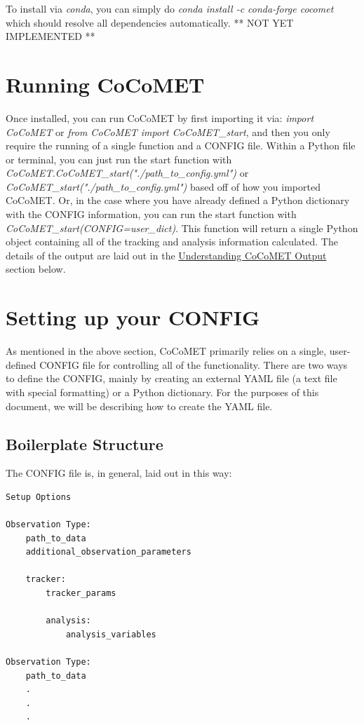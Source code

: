 \documentclass[10pt,a4paper]{article}
\begin{document}
	To install via \emph{conda}, you can simply do \emph{conda install -c conda-forge cocomet} which should resolve all dependencies automatically. ** NOT YET IMPLEMENTED **
	
	\section{Running CoCoMET}
	Once installed, you can run CoCoMET by first importing it via: \emph{import CoCoMET} or \emph{from CoCoMET import CoCoMET\_start}, and then you only require the running of a single function and a CONFIG file. Within a Python file or terminal, you can just run the start function with \emph{CoCoMET.CoCoMET\_start("./path\_to\_config.yml")} or \emph{CoCoMET\_start("./path\_to\_config.yml")} based off of how you imported CoCoMET. Or, in the case where you have already defined a Python dictionary with the CONFIG information, you can run the start function with \emph{CoCoMET\_start(CONFIG=user\_dict)}. This function will return a single Python object containing all of the tracking and analysis information calculated. The details of the output are laid out in the \hyperref[sec:out]{Understanding CoCoMET Output} section below. 
	
	\section{Setting up your CONFIG}
	As mentioned in the above section, CoCoMET primarily relies on a single, user-defined CONFIG file for controlling all of the functionality. There are two ways to define the CONFIG, mainly by creating an external YAML file (a text file with special formatting) or a Python dictionary. For the purposes of this document, we will be describing how to create the YAML file.
	
		\subsection{Boilerplate Structure}
		The CONFIG file is, in general, laid out in this way:
		
		\begin{lstlisting}
Setup Options

Observation Type:
	path_to_data
	additional_observation_parameters

	tracker:
		tracker_params

		analysis:
			analysis_variables

Observation Type:
	path_to_data
	.
	.
	.
		\end{lstlisting}
		
\end{document}
